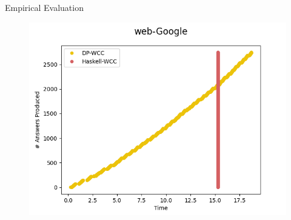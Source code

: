 \documentclass{beamer}
\begin{document}
\begin{frame}[fragile]{Empirical Evaluation}
\begin{figure}[!htb]
\begin{minipage}{0.33\textwidth}
         \includegraphics[width=1\linewidth, height=0.2\textheight]{web_google}
        \end{minipage}
    \end{figure}
    
  \end{frame}
\end{document}
